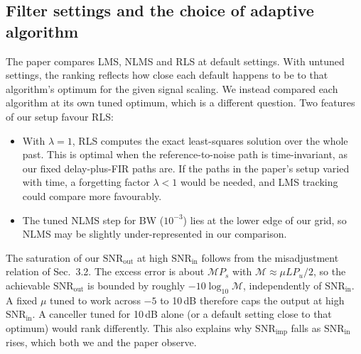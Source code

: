 \documentclass[11pt,a4paper]{article}
\newcommand{\snrin}{\mathrm{SNR}_\mathrm{in}}
\newcommand{\snrout}{\mathrm{SNR}_\mathrm{out}}
\newcommand{\snrimp}{\mathrm{SNR}_\mathrm{imp}}
\begin{document}
\subsection{Filter settings and the choice of adaptive algorithm}
The paper compares LMS, NLMS and RLS at default settings. With untuned settings, the ranking reflects how close each
default happens to be to that algorithm's optimum for the given signal scaling. We instead compared each algorithm at
its own tuned optimum, which is a different question. Two features of our setup favour RLS:
\begin{itemize}
  \item With $\lambda=1$, RLS computes the exact least-squares solution over the whole past. This is optimal when the
        reference-to-noise path is time-invariant, as our fixed delay-plus-FIR paths are. If the paths in the paper's
        setup varied with time, a forgetting factor $\lambda<1$ would be needed, and LMS tracking could compare more
        favourably.
  \item The tuned NLMS step for BW ($10^{-3}$) lies at the lower edge of our grid, so NLMS may be slightly
        under-represented in our comparison.
\end{itemize}
The saturation of our $\snrout$ at high $\snrin$ follows from the misadjustment relation of Sec.~3.2. The excess
error is about $\mathcal{M}P_s$ with $\mathcal{M}\approx\mu LP_u/2$, so the achievable $\snrout$ is bounded by roughly
$-10\log_{10}\mathcal{M}$, independently of $\snrin$. A fixed $\mu$ tuned to work across $-5$ to 10\,dB therefore
caps the output at high $\snrin$. A canceller tuned for 10\,dB alone (or a default setting close to that optimum)
would rank differently. This also explains why $\snrimp$ falls as $\snrin$ rises, which both we and the paper
observe.
\end{document}
